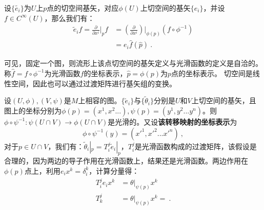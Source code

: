 设$\{\widetilde{e_i}\}$为$U$上$p$点的切空间基矢，对应$\phi (U)$上切空间的基矢$\{{e_i}\}$，并设$f\in C^{\infty}(U)$，那么我们有：
\begin{equation}
\begin{aligned}
\widetilde e_i f=\frac{\partial}{\partial x^i}\bigg|_p f&= (\frac{\partial}{\partial x^i})\bigg|_{\phi(p)}(f\circ \phi^{-1})\\
&=e_i\hat f(\hat p)~.
\end{aligned}
\end{equation}

可见，固定一个图，则流形上该点切空间的基矢定义与光滑函数的定义是自洽的。称$\hat f=f\circ \phi^{-1}$为光滑函数$f$的坐标表示，$\hat p=\phi (p)$为$p$点的坐标表示。
切空间是线性空间，因此也可以通过过渡矩阵进行基矢组的变换。

设$(U,\phi),(V,\psi)$是$M$上相容的图。$\{\widetilde e_i\}$与$\{\widetilde \theta_i\}$分别是$U$和$V$上切空间的基矢，且图上的坐标分别为$\phi(p)=(x^1,x^2...),\psi(p)=(y^1,y^2...y^n)$。则$\phi\circ\psi^{-1}:\psi(U\cap V)\rightarrow\phi(U\cap V)$是光滑的。又设\textbf{该转移映射的坐标表示}为
\begin{equation}
\phi\circ \psi^{-1}(y)=(x'^1,x'^2...x'^n)~,
\end{equation}
对于$p\in U\cap V$，我们有：$\widetilde\theta_i|_p=T^j_i \widetilde e_i|_p$，$T^j_i$是光滑函数构成的过渡矩阵，该假设是合理的，因为两边的导子作用在光滑函数上，结果还是光滑函数。两边作用在$\phi(p)$点上，利用$e_ix^k=\delta^k_i$，计算分量得：
\begin{equation}
\begin{aligned}
 T^j_i e_i x^k&=\theta |_{\psi(p)}x^k\\
T^j_k&=\theta |_{\psi(p)}x^k=~.
\end{aligned}
\end{equation}

